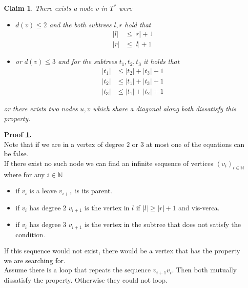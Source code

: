 \documentclass[11pt,a4paper,ngerman]{article}
\newtheorem{lemma}{\bfseries Claim}
\begin{document}
\begin{lemma}\label{alge:ueb3:centerpoint}
There exists a node $v$ in $T^*$ were
\begin{itemize}
    \item $d(v) \leq 2$ and the both subtrees $l, r$ hold that
        \begin{equation}\begin{split}
            |l| &\leq |r| + 1\\
            |r| &\leq |l| + 1
        \end{split}\end{equation}
    \item or $d(v) \leq 3$ and for the subtrees $t_1, t_2, t_3$ it holds that
        \begin{equation}\begin{split}
            |t_1| &\leq |t_2| + |t_3| + 1\\
            |t_2| &\leq |t_1| + |t_3| + 1\\
            |t_3| &\leq |t_1| + |t_2| + 1
        \end{split}\end{equation}
\end{itemize}
or there exists two nodes $u,v$ which share a diagonal along both dissatisfy this property.
\end{lemma}

\textbf{Proof \ref{alge:ueb3:centerpoint}.}\\
Note that if we are in a vertex of degree $2$ or $3$ at most one of the equations can be false.\\

If there exist no such node we can find an infinite sequence of vertices $(v_i)_{i\in \mathbb{N}}$
where for any $i \in \mathbb{N}$
\begin{itemize}
    \item if $v_i$ is a leave $v_{i+1}$ is its parent.
    \item if $v_i$ has degree $2$ $v_{i+1}$ is the vertex in $l$ if $|l| \geq |r| + 1$ and vis-verca.
    \item if $v_i$ has degree $3$ $v_{i+1}$ is the vertex in the subtree that does not satisfy the condition.
\end{itemize}
If this sequence would not exist, there would be a vertex that has the property we are searching for.\\

Assume there is a loop that repeats the sequence $v_{i+1}v_i$. Then both mutually dissatisfy the property.
Otherwise they could not loop.\\
\end{document}
